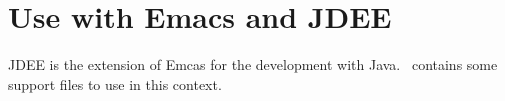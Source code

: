 \section{Use with Emacs and JDEE}

JDEE is the extension of Emcas for the development with Java. \ExTeX\
contains some support files to use in this context.

\INCOMPLETE


